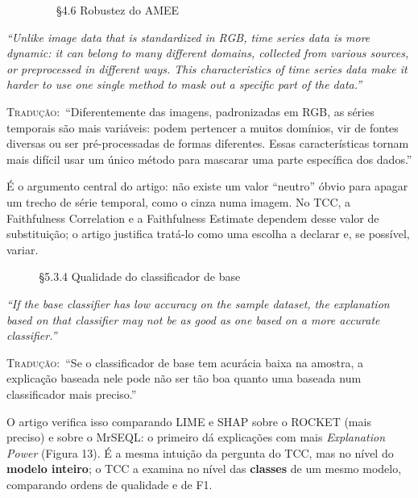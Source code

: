 \documentclass[11pt,a4paper]{article}
\newcommand{\pagechip}[1]{{\setlength{\fboxsep}{1.5pt}\colorbox{cAcc}{\textcolor{white}{\scriptsize\texttt{#1}}}}}
\newenvironment{origquote}{\par\itshape\small}{\par}
\newenvironment{tradquote}{\par\small\textsc{Tradução:}\ }{\par}
\newcommand{\explab}[1]{\par\smallskip{\small\color{cAcc}\textbf{\MakeUppercase{#1}}}\par}
\begin{document}
\begin{citacard}{\pagechip{p. 12--13} §4.6 Robustez do AMEE}
\begin{origquote}“Unlike image data that is standardized in RGB, time series data is more dynamic: it can belong to many different domains, collected from various sources, or preprocessed in different ways. This characteristics of time series data make it harder to use one single method to mask out a specific part of the data.”\end{origquote}
\begin{tradquote}“Diferentemente das imagens, padronizadas em RGB, as séries temporais são mais variáveis: podem pertencer a muitos domínios, vir de fontes diversas ou ser pré-processadas de formas diferentes. Essas características tornam mais difícil usar um único método para mascarar uma parte específica dos dados.”\end{tradquote}
\explab{Explicação}
É o argumento central do artigo: não existe um valor ``neutro'' óbvio para apagar um trecho de série temporal, como o cinza numa imagem. No TCC, a Faithfulness Correlation e a Faithfulness Estimate dependem desse valor de substituição; o artigo justifica tratá-lo como uma escolha a declarar e, se possível, variar.
\end{citacard}

\begin{citacard}{\pagechip{p. 19} §5.3.4 Qualidade do classificador de base}
\begin{origquote}“If the base classifier has low accuracy on the sample dataset, the explanation based on that classifier may not be as good as one based on a more accurate classifier.”\end{origquote}
\begin{tradquote}“Se o classificador de base tem acurácia baixa na amostra, a explicação baseada nele pode não ser tão boa quanto uma baseada num classificador mais preciso.”\end{tradquote}
\explab{Explicação}
O artigo verifica isso comparando LIME e SHAP sobre o ROCKET (mais preciso) e sobre o MrSEQL: o primeiro dá explicações com mais \textit{Explanation Power} (Figura 13). É a mesma intuição da pergunta do TCC, mas no nível do \textbf{modelo inteiro}; o TCC a examina no nível das \textbf{classes} de um mesmo modelo, comparando ordens de qualidade e de F1.
\end{citacard}
\end{document}

